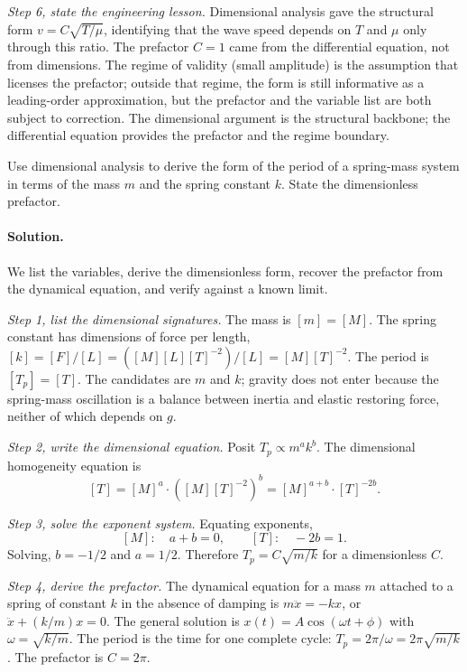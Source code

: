 \begin{exercise}
\textit{Step 6, state the engineering lesson.} Dimensional analysis
gave the structural form $v = C \sqrt{T/\mu}$, identifying that the
wave speed depends on $T$ and $\mu$ only through this ratio. The
prefactor $C = 1$ came from the differential equation, not from
dimensions. The regime of validity (small amplitude) is the
assumption that licenses the prefactor; outside that regime, the form
is still informative as a leading-order approximation, but the
prefactor and the variable list are both subject to correction. The
dimensional argument is the structural backbone; the differential
equation provides the prefactor and the regime boundary.
\end{exercise}

\begin{exercise}
Use dimensional analysis to derive the form of the period of a
spring-mass system in terms of the mass $m$ and the spring constant
$k$. State the dimensionless prefactor.

\paragraph{Solution.}
We list the variables, derive the dimensionless form, recover the
prefactor from the dynamical equation, and verify against a known
limit.

\textit{Step 1, list the dimensional signatures.} The mass is
$[m] = [M]$. The spring constant has dimensions of force per length,
$[k] = [F]/[L] = ([M][L][T]^{-2})/[L] = [M][T]^{-2}$. The period is
$[T_{p}] = [T]$. The candidates are $m$ and $k$; gravity does not
enter because the spring-mass oscillation is a balance between
inertia and elastic restoring force, neither of which depends on
$g$.

\textit{Step 2, write the dimensional equation.} Posit
$T_{p} \propto m^{a} k^{b}$. The dimensional homogeneity equation is
\[
[T] = [M]^{a} \cdot ([M][T]^{-2})^{b} = [M]^{a+b} \cdot [T]^{-2b}.
\]

\textit{Step 3, solve the exponent system.} Equating exponents,
\[
[M]: \quad a + b = 0, \qquad [T]: \quad -2b = 1.
\]
Solving, $b = -1/2$ and $a = 1/2$. Therefore
$T_{p} = C \sqrt{m/k}$ for a dimensionless $C$.

\textit{Step 4, derive the prefactor.} The dynamical equation for a
mass $m$ attached to a spring of constant $k$ in the absence of
damping is $m \ddot{x} = -k x$, or $\ddot{x} + (k/m) x = 0$. The
general solution is $x(t) = A \cos(\omega t + \phi)$ with
$\omega = \sqrt{k/m}$. The period is the time for one complete
cycle: $T_{p} = 2\pi / \omega = 2\pi \sqrt{m/k}$. The prefactor is
$C = 2\pi$.


\end{exercise}
